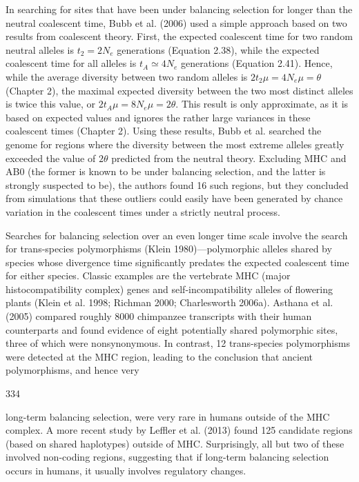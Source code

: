 \documentclass{article}
\begin{document}
In searching for sites that have been under balancing selection for longer than the neutral coalescent time, Bubb et al. (2006) used a simple approach based on two results from coalescent theory. First, the expected coalescent time for two random neutral alleles is  $ t_2 = 2N_e $ generations (Equation 2.38), while the expected coalescent time for all alleles is  $ t_A \simeq 4N_e $ generations (Equation 2.41). Hence, while the average diversity between two random alleles is  $ 2t_2\mu = 4N_e\mu = \theta $ (Chapter 2), the maximal expected diversity between the two most distinct alleles is twice this value, or  $ 2t_A\mu = 8N_e\mu = 2\theta $. This result is only approximate, as it is based on expected values and ignores the rather large variances in these coalescent times (Chapter 2). Using these results, Bubb et al. searched the genome for regions where the diversity between the most extreme alleles greatly exceeded the value of  $ 2\theta $ predicted from the neutral theory. Excluding MHC and AB0 (the former is known to be under balancing selection, and the latter is strongly suspected to be), the authors found 16 such regions, but they concluded from simulations that these outliers could easily have been generated by chance variation in the coalescent times under a strictly neutral process.

Searches for balancing selection over an even longer time scale involve the search for trans-species polymorphisms (Klein 1980)—polymorphic alleles shared by species whose divergence time significantly predates the expected coalescent time for either species. Classic examples are the vertebrate MHC (major histocompatibility complex) genes and self-incompatibility alleles of flowering plants (Klein et al. 1998; Richman 2000; Charlesworth 2006a). Asthana et al. (2005) compared roughly 8000 chimpanzee transcripts with their human counterparts and found evidence of eight potentially shared polymorphic sites, three of which were nonsynonymous. In contrast, 12 trans-species polymorphisms were detected at the MHC region, leading to the conclusion that ancient polymorphisms, and hence very

334

long-term balancing selection, were very rare in humans outside of the MHC complex. A more recent study by Leffler et al. (2013) found 125 candidate regions (based on shared haplotypes) outside of MHC. Surprisingly, all but two of these involved non-coding regions, suggesting that if long-term balancing selection occurs in humans, it usually involves regulatory changes.
\end{document}
